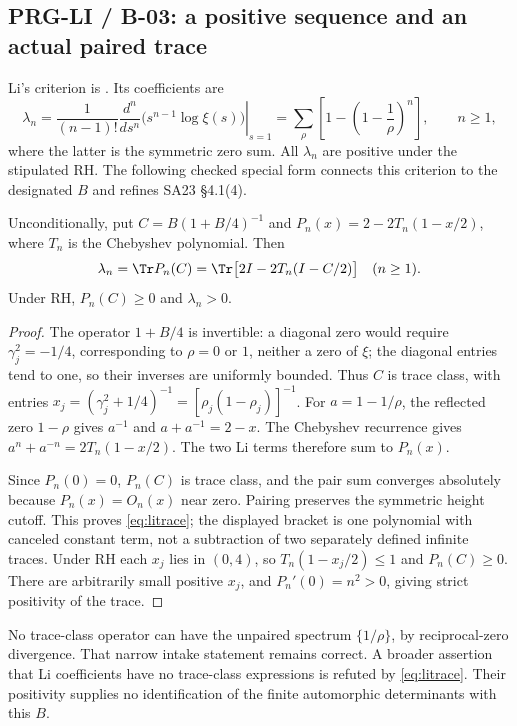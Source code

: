 \subsection{PRG-LI / B-03: a positive sequence and an actual paired trace}
Li's criterion is \cite[\S1, Theorem 1]{li}. Its coefficients are
\[
 \lambda_n=\frac1{(n-1)!}\left.\frac{d^n}{ds^n}
 \bigl(s^{n-1}\log\xi(s)\bigr)\right|_{s=1}
 =\sum_\rho\left[1-\left(1-\frac1\rho\right)^n\right],\qquad n\ge1,
\]
where the latter is the symmetric zero sum. All $\lambda_n$ are positive under the stipulated RH. The following checked special form connects this criterion to the designated $B$ and refines SA23 \S4.1(4).

\begin{proposition}
Unconditionally, put $C=B(1+B/4)^{-1}$ and $P_n(x)=2-2T_n(1-x/2)$, where $T_n$ is the Chebyshev polynomial. Then
\begin{equation}\label{eq:litrace}
 \lambda_n=\Tr P_n(C)=\Tr\bigl[2I-2T_n(I-C/2)\bigr]\quad(n\ge1).
\end{equation}
Under RH, $P_n(C)\ge0$ and $\lambda_n>0$.
\end{proposition}
\begin{proof}
The operator $1+B/4$ is invertible: a diagonal zero would require $\gamma_j^2=-1/4$, corresponding to $\rho=0$ or $1$, neither a zero of $\xi$; the diagonal entries tend to one, so their inverses are uniformly bounded. Thus $C$ is trace class, with entries
$x_j=(\gamma_j^2+1/4)^{-1}=[\rho_j(1-\rho_j)]^{-1}$.
For $a=1-1/\rho$, the reflected zero $1-\rho$ gives $a^{-1}$ and
$a+a^{-1}=2-x$. The Chebyshev recurrence gives
$a^n+a^{-n}=2T_n(1-x/2)$. The two Li terms therefore sum to $P_n(x)$.

Since $P_n(0)=0$, $P_n(C)$ is trace class, and the pair sum converges absolutely because $P_n(x)=O_n(x)$ near zero. Pairing preserves the symmetric height cutoff. This proves \eqref{eq:litrace}; the displayed bracket is one polynomial with canceled constant term, not a subtraction of two separately defined infinite traces. Under RH each $x_j$ lies in $(0,4)$, so $T_n(1-x_j/2)\le1$ and $P_n(C)\ge0$. There are arbitrarily small positive $x_j$, and $P_n'(0)=n^2>0$, giving strict positivity of the trace.
\end{proof}
No trace-class operator can have the unpaired spectrum $\{1/\rho\}$, by reciprocal-zero divergence. That narrow intake statement remains correct. A broader assertion that Li coefficients have no trace-class expressions is refuted by \eqref{eq:litrace}. Their positivity supplies no identification of the finite automorphic determinants with this $B$.

